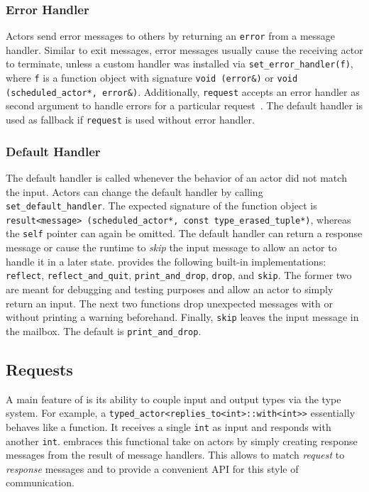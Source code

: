 \subsubsection{Error Handler}
\label{error-message}

Actors send error messages to others by returning an \lstinline^error^  from a message handler. Similar to exit messages, error messages usually cause the receiving actor to terminate, unless a custom handler was installed via \lstinline^set_error_handler(f)^, where \lstinline^f^ is a function object with signature \lstinline^void (error&)^ or \lstinline^void (scheduled_actor*, error&)^. Additionally, \lstinline^request^ accepts an error handler as second argument to handle errors for a particular request~. The default handler is used as fallback if \lstinline^request^ is used without error handler. 

\subsubsection{Default Handler}
\label{default-handler}

The default handler is called whenever the behavior of an actor did not match the input. Actors can change the default handler by calling \lstinline^set_default_handler^. The expected signature of the function object is \lstinline^result<message> (scheduled_actor*, const type_erased_tuple*)^, whereas the \lstinline^self^ pointer can again be omitted. The default handler can return a response message or cause the runtime to \emph{skip} the input message to allow an actor to handle it in a later state. \lib provides the following built-in implementations: \lstinline^reflect^, \lstinline^reflect_and_quit^, \lstinline^print_and_drop^, \lstinline^drop^, and \lstinline^skip^. The former two are meant for debugging and testing purposes and allow an actor to simply return an input. The next two functions drop unexpected messages with or without printing a warning beforehand. Finally, \lstinline^skip^ leaves the input message in the mailbox. The default is \lstinline^print_and_drop^.

\subsection{Requests}
\label{request}

A main feature of \lib is its ability to couple input and output types via the type system. For example, a \lstinline^typed_actor<replies_to<int>::with<int>>^ essentially behaves like a function. It receives a single \lstinline^int^ as input and responds with another \lstinline^int^. \lib embraces this functional take on actors by simply creating response messages from the result of message handlers. This allows \lib to match \emph{request} to \emph{response} messages and to provide a convenient API for this style of communication.

